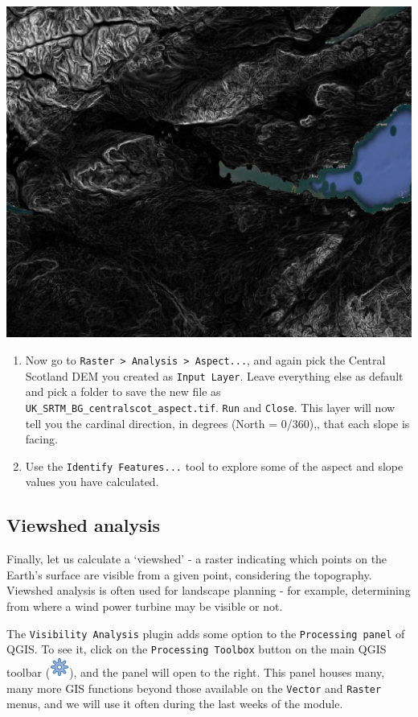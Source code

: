 \documentclass[
  letterpaper,
  DIV=11,
  numbers=noendperiod]{scrreprt}
\begin{document}
\includegraphics{images/lab_5/lab5_fig6_slope.jpg}

\begin{enumerate}
\def\labelenumi{(\arabic{enumi})}
\setcounter{enumi}{150}
\item
  Now go to
  \texttt{Raster\ \textgreater{}\ Analysis\ \textgreater{}\ Aspect...},
  and again pick the Central Scotland DEM you created as
  \texttt{Input\ Layer}. Leave everything else as default and pick a
  folder to save the new file as
  \texttt{UK\_SRTM\_BG\_centralscot\_aspect.tif}. \texttt{Run} and
  \texttt{Close}. This layer will now tell you the cardinal direction,
  in degrees (North = 0/360),, that each slope is facing.
\item
  Use the \texttt{Identify\ Features...} tool to explore some of the
  aspect and slope values you have calculated.
\end{enumerate}

\subsection{Viewshed analysis}\label{viewshed-analysis}

Finally, let us calculate a `viewshed' - a raster indicating which
points on the Earth's surface are visible from a given point,
considering the topography. Viewshed analysis is often used for
landscape planning - for example, determining from where a wind power
turbine may be visible or not.

The \texttt{Visibility\ Analysis} plugin adds some option to the
\texttt{Processing\ panel} of QGIS. To see it, click on the
\texttt{Processing\ Toolbox} button on the main QGIS toolbar
(\includegraphics{index_files/mediabag/processingAlgorithm.png}), and
the panel will open to the right. This panel houses many, many more GIS
functions beyond those available on the \texttt{Vector} and
\texttt{Raster} menus, and we will use it often during the last weeks of
the module.
\end{document}
